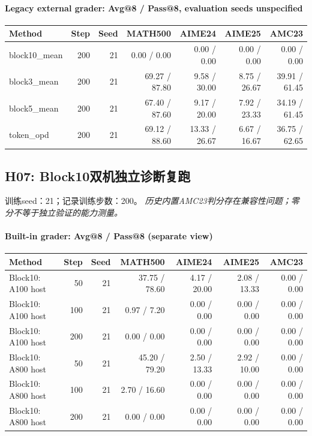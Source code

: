 \paragraph{Legacy external grader: Avg@8 / Pass@8, evaluation seeds unspecified}
{\footnotesize\setlength{\tabcolsep}{3.5pt}
\begin{longtable}{@{}p{1.4in}rrrrrr@{}}
\toprule
Method & Step & Seed & MATH500 & AIME24 & AIME25 & AMC23 \\
\midrule\endhead
block10\_\allowbreak{}mean & 200 & 21 & 0.00 / 0.00 & 0.00 / 0.00 & 0.00 / 0.00 & 0.00 / 0.00 \\
block3\_\allowbreak{}mean & 200 & 21 & 69.27 / 87.80 & 9.58 / 30.00 & 8.75 / 26.67 & 39.91 / 61.45 \\
block5\_\allowbreak{}mean & 200 & 21 & 67.40 / 87.60 & 9.17 / 20.00 & 7.92 / 23.33 & 34.19 / 61.45 \\
token\_\allowbreak{}opd & 200 & 21 & 69.12 / 88.60 & 13.33 / 26.67 & 6.67 / 16.67 & 36.75 / 62.65 \\
\bottomrule\end{longtable}
}
\subsection{H07: Block10双机独立诊断复跑}
\label{history:block10_collapse}
训练seed：21；记录训练步数：200。
\emph{历史内置AMC23判分存在兼容性问题；零分不等于独立验证的能力测量。}
\paragraph{Built-in grader: Avg@8 / Pass@8 (separate view)}
{\footnotesize\setlength{\tabcolsep}{3.5pt}
\begin{longtable}{@{}p{1.4in}rrrrrr@{}}
\toprule
Method & Step & Seed & MATH500 & AIME24 & AIME25 & AMC23 \\
\midrule\endhead
Block10: A100 host & 50 & 21 & 37.75 / 78.60 & 4.17 / 20.00 & 2.08 / 13.33 & 0.00 / 0.00 \\
Block10: A100 host & 100 & 21 & 0.97 / 7.20 & 0.00 / 0.00 & 0.00 / 0.00 & 0.00 / 0.00 \\
Block10: A100 host & 200 & 21 & 0.00 / 0.00 & 0.00 / 0.00 & 0.00 / 0.00 & 0.00 / 0.00 \\
Block10: A800 host & 50 & 21 & 45.20 / 79.20 & 2.50 / 13.33 & 2.92 / 10.00 & 0.00 / 0.00 \\
Block10: A800 host & 100 & 21 & 2.70 / 16.60 & 0.00 / 0.00 & 0.00 / 0.00 & 0.00 / 0.00 \\
Block10: A800 host & 200 & 21 & 0.00 / 0.00 & 0.00 / 0.00 & 0.00 / 0.00 & 0.00 / 0.00 \\
\bottomrule\end{longtable}
}
